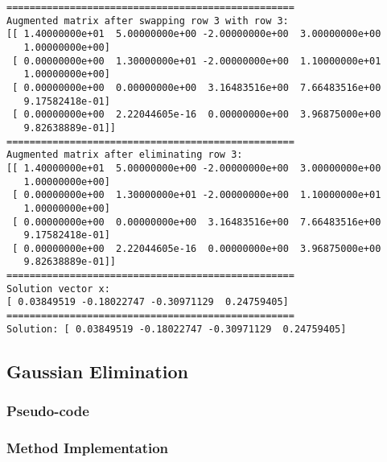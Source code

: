 \documentclass{article}
\begin{document}
\begin{lstlisting}
==================================================
Augmented matrix after swapping row 3 with row 3:
[[ 1.40000000e+01  5.00000000e+00 -2.00000000e+00  3.00000000e+00
   1.00000000e+00]
 [ 0.00000000e+00  1.30000000e+01 -2.00000000e+00  1.10000000e+01
   1.00000000e+00]
 [ 0.00000000e+00  0.00000000e+00  3.16483516e+00  7.66483516e+00
   9.17582418e-01]
 [ 0.00000000e+00  2.22044605e-16  0.00000000e+00  3.96875000e+00
   9.82638889e-01]]
==================================================
Augmented matrix after eliminating row 3:
[[ 1.40000000e+01  5.00000000e+00 -2.00000000e+00  3.00000000e+00
   1.00000000e+00]
 [ 0.00000000e+00  1.30000000e+01 -2.00000000e+00  1.10000000e+01
   1.00000000e+00]
 [ 0.00000000e+00  0.00000000e+00  3.16483516e+00  7.66483516e+00
   9.17582418e-01]
 [ 0.00000000e+00  2.22044605e-16  0.00000000e+00  3.96875000e+00
   9.82638889e-01]]
==================================================
Solution vector x:
[ 0.03849519 -0.18022747 -0.30971129  0.24759405]
==================================================
Solution: [ 0.03849519 -0.18022747 -0.30971129  0.24759405]
        \end{lstlisting}
    \subsection{Gaussian Elimination}
        \subsubsection{Pseudo-code}

        \subsubsection{Method Implementation}
\end{document}

